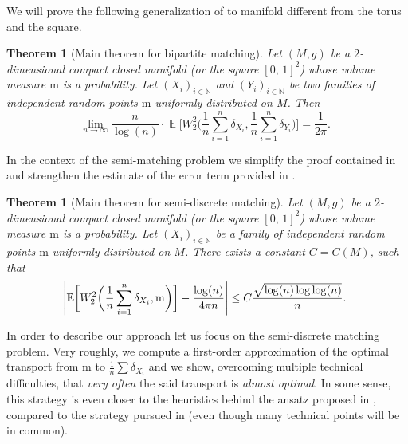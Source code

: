 \documentclass[JEP,XML,SOM,Unicode]{cedram}
\newcounter{results}[section]
\theoremstyle{plain}
\newtheorem{theorem}[results]{Theorem}
\theoremstyle{definition}
\numberwithin{equation}{section}
\newcommand{\NN}{\ensuremath{\mathbb N}}
\newcommand{\bbE}[1]{\ensuremath{\operatorname{\mathbb{E}}\biggl[#1\biggr]}}
\newcommand{\cc}[2]{\ensuremath{\left[#1,\,#2\right]}}
\newcommand{\fullstop}{\ensuremath{\text{. }}}
\newcommand{\m}{\ensuremath{\mathrm m}}
\newcommand{\metric}{\ensuremath{g}}
\DeclarePairedDelimiter\abs{\lvert}{\rvert}
\begin{document}
We will prove the following generalization of \cite[Eq.\,(1.2)]{Ambrosio-Stra-Trevisan2018}
to manifold different from the torus and the square.

\begin{theorem}[Main theorem for bipartite matching]\label{thm:main_theorem_bipartite}
Let $(M,\metric)$ be a $2$-dimensional compact closed manifold (or the square $\cc01^2$) whose
volume measure $\m$ is a probability.
Let $(X_i)_{i\in\NN}$ and $(Y_i)_{i\in\NN}$ be two families of independent random points
$\m$-uniformly distributed on $M$. Then\vspace*{-3pt}
\begin{equation*}
\lim_{n\to\infty} \frac{n}{\log(n)}\cdot
\bbE{W^2_2\biggl(\frac1n\sum_{i=1}^n\delta_{X_i}, \frac1n\sum_{i=1}^n\delta_{Y _i}\biggr)}
=\frac1{2\pi} \fullstop
\end{equation*}
\end{theorem}

In the context of the semi-matching problem we simplify
the proof contained in \cite{Ambrosio-Stra-Trevisan2018} and strengthen the estimate of the error
term provided in \cite{Ledoux18}.

\begin{theorem}[Main theorem for semi-discrete matching]\label{thm:main_theorem_semidiscrete}
Let $(M,\metric)$ be a $2$-dimen\-sion\-al compact closed manifold (or the square $\cc01^2$)
whose volume measure $\m$ is a probability.
Let $(X_i)_{i\in\NN}$ be a family of independent random points $\m$-uniformly distributed on $M$.
There exists a constant $C=C(M)$, such that
\begin{equation*}
\abs*{\bbE{W^2_2\biggl(\frac1n\sum_{i=1}^n\delta_{X_i}, \m\biggr)} - \frac{\log(n)}{4\pi n}}
\le C \frac{\sqrt{\log(n)\log\log(n)}}n \fullstop
\end{equation*}
\end{theorem}

In order to describe our approach let us focus on the semi-discrete matching problem.
Very roughly, we compute a first-order approximation of the optimal transport from $\m$ to
$\frac1n\sum \delta_{X_i}$ and we show, overcoming multiple technical difficulties, that \emph{very often}
the said transport is \emph{almost optimal}.
In some sense, this strategy is even closer to the
heuristics behind the ansatz proposed in \cite{CaraccioloEtAl2014}, compared to the strategy pursued in
\cite{Ambrosio-Stra-Trevisan2018} (even though many technical points will be in common).
\end{document}
